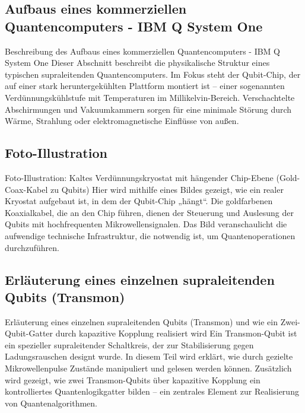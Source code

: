 \subsection{Aufbaus eines kommerziellen Quantencomputers - IBM Q System One}
Beschreibung des Aufbaus eines kommerziellen Quantencomputers - IBM Q System One
Dieser Abschnitt beschreibt die physikalische Struktur eines typischen supraleitenden Quantencomputers. Im Fokus steht der Qubit-Chip, der auf einer stark heruntergekühlten Plattform montiert ist – einer sogenannten Verdünnungskühlstufe mit Temperaturen im Millikelvin-Bereich. Verschachtelte Abschirmungen und Vakuumkammern sorgen für eine minimale Störung durch Wärme, Strahlung oder elektromagnetische Einflüsse von außen.

\subsection{Foto-Illustration}
Foto-Illustration: Kaltes Verdünnungskryostat mit hängender Chip-Ebene (Gold-Coax-Kabel zu Qubits)
Hier wird mithilfe eines Bildes gezeigt, wie ein realer Kryostat aufgebaut ist, in dem der Qubit-Chip „hängt“. Die goldfarbenen Koaxialkabel, die an den Chip führen, dienen der Steuerung und Auslesung der Qubits mit hochfrequenten Mikrowellensignalen. Das Bild veranschaulicht die aufwendige technische Infrastruktur, die notwendig ist, um Quantenoperationen durchzuführen.

\subsection{Erläuterung eines einzelnen supraleitenden Qubits (Transmon)}
Erläuterung eines einzelnen supraleitenden Qubits (Transmon) und wie ein Zwei-Qubit-Gatter durch kapazitive Kopplung realisiert wird
Ein Transmon-Qubit ist ein spezieller supraleitender Schaltkreis, der zur Stabilisierung gegen Ladungsrauschen designt wurde. In diesem Teil wird erklärt, wie durch gezielte Mikrowellenpulse Zustände manipuliert und gelesen werden können. Zusätzlich wird gezeigt, wie zwei Transmon-Qubits über kapazitive Kopplung ein kontrolliertes Quantenlogikgatter bilden – ein zentrales Element zur Realisierung von Quantenalgorithmen.

\printbibliography

